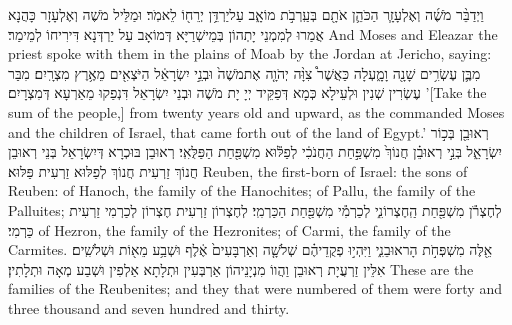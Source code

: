 {וַיְדַבֵּ֨ר מֹשֶׁ֜ה וְאֶלְעָזָ֧ר הַכֹּהֵ֛ן אֹתָ֖ם בְּעַֽרְבֹ֣ת מוֹאָ֑ב עַל\maqqaf יַרְדֵּ֥ן יְרֵח֖וֹ לֵאמֹֽר׃}
{וּמַלֵּיל מֹשֶׁה וְאֶלְעָזָר כָּהֲנָא אֲמַרוּ לְמִמְנֵי יָתְהוֹן בְּמֵישְׁרַיָּא דְּמוֹאָב עַל יַרְדְּנָא דִּירִיחוֹ לְמֵימַר׃}
{And Moses and Eleazar the priest spoke with them in the plains of Moab by the Jordan at Jericho, saying:}{}
{מִבֶּ֛ן עֶשְׂרִ֥ים שָׁנָ֖ה וָמָ֑עְלָה כַּאֲשֶׁר֩ צִוָּ֨ה יְהֹוָ֤ה אֶת\maqqaf מֹשֶׁה֙ וּבְנֵ֣י יִשְׂרָאֵ֔ל הַיֹּצְאִ֖ים מֵאֶ֥רֶץ מִצְרָֽיִם׃}
{מִבַּר עֶשְׂרִין שְׁנִין וּלְעֵילָא כְּמָא דְּפַקֵּיד יְיָ יָת מֹשֶׁה וּבְנֵי יִשְׂרָאֵל דִּנְפַקוּ מֵאַרְעָא דְּמִצְרָיִם׃}
{’[Take the sum of the people,] from twenty years old and upward, as the \lord\space commanded Moses and the children of Israel, that came forth out of the land of Egypt.’}{}
{רְאוּבֵ֖ן בְּכ֣וֹר יִשְׂרָאֵ֑ל בְּנֵ֣י רְאוּבֵ֗ן חֲנוֹךְ֙ מִשְׁפַּ֣חַת הַחֲנֹכִ֔י לְפַלּ֕וּא מִשְׁפַּ֖חַת הַפַּלֻּאִֽי׃}
{רְאוּבֵן בּוּכְרָא דְּיִשְׂרָאֵל בְּנֵי רְאוּבֵן חֲנוֹךְ זַרְעִית חֲנוֹךְ לְפַלּוּא זַרְעִית פַּלּוּא׃}
{Reuben, the first-born of Israel: the sons of Reuben: of Hanoch, the family of the Hanochites; of Pallu, the family of the Palluites;}{}
{לְחֶצְרֹ֕ן מִשְׁפַּ֖חַת הַֽחֶצְרוֹנִ֑י לְכַרְמִ֕י מִשְׁפַּ֖חַת הַכַּרְמִֽי׃}
{לְחֶצְרוֹן זַרְעִית חֶצְרוֹן לְכַרְמִי זַרְעִית כַּרְמִי׃}
{of Hezron, the family of the Hezronites; of Carmi, the family of the Carmites.}{}
{אֵ֖לֶּה מִשְׁפְּחֹ֣ת הָראוּבֵנִ֑י וַיִּהְי֣וּ פְקֻדֵיהֶ֗ם שְׁלֹשָׁ֤ה וְאַרְבָּעִים֙ אֶ֔לֶף וּשְׁבַ֥ע מֵא֖וֹת וּשְׁלֹשִֽׁים׃}
{אִלֵּין זַרְעֲיָת רְאוּבֵן וַהֲווֹ מִנְיָנֵיהוֹן אַרְבְּעִין וּתְלָתָא אַלְפִין וּשְׁבַע מְאָה וּתְלָתִין׃}
{These are the families of the Reubenites; and they that were numbered of them were forty and three thousand and seven hundred and thirty.}{}
